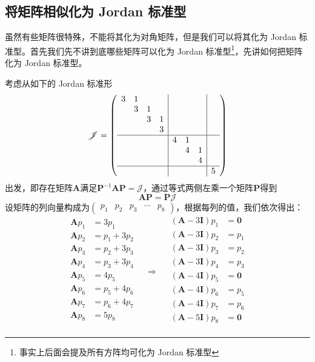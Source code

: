 \subsection{将矩阵相似化为 Jordan 标准型}

虽然有些矩阵很特殊，不能将其化为对角矩阵，但是我们可以将其化为 Jordan 标准型。首先我们先不讲到底哪些矩阵可以化为 Jordan 标准型\footnote{事实上后面会提及所有方阵均可化为 Jordan 标准型}，先讲如何把矩阵化为 Jordan 标准型。

考虑从如下的 Jordan 标准形 $$\mathscr{J}=\left( \begin{array}{cccc|ccc|c}
 3 & 1 &  &  &  &  &  & \\
  & 3 & 1 &  &  &  &  & \\
  &  & 3 & 1 &  &  &  & \\
  &  &  & 3 &  &  &  & \\ \hline
  &  &  &  & 4 & 1 &  & \\
  &  &  &  &  & 4 & 1 & \\
  &  &  &  &  &  & 4 & \\ \hline
  &  &  &  &  &  &  & 5
\end{array} \right)$$ 出发，即存在矩阵$\mathbf{A}$满足$\mathbf{P}^{-1}\mathbf{A}\mathbf{P}=\mathscr{J}$，通过等式两侧左乘一个矩阵$\mathbf{P}$得到$$\mathbf{A}\mathbf{P}=\mathbf{P}\mathscr{J}$$设矩阵的列向量构成为$\begin{pmatrix}
 p_1 & p_2 & p_3 & \cdots &p_8
\end{pmatrix}$，根据每列的值，我们依次得出：\begin{equation}
	\label{eq:simToJordan}
	\begin{aligned}
    \mathbf{A}p_1&= 3p_1\\
    \mathbf{A}p_2&= p_1+3p_2\\
    \mathbf{A}p_3&= p_2+3p_3\\
    \mathbf{A}p_4&= p_3+3p_4\\ \hline
    \mathbf{A}p_5&= 4p_5\\
    \mathbf{A}p_6&= p_5+4p_6\\
    \mathbf{A}p_7&= p_6+4p_7\\ \hline
    \mathbf{A}p_8&= 5p_8\\
\end{aligned}\quad \Longrightarrow \quad \begin{aligned}
    (\mathbf{A}-3\mathbf{I})p_1&= \boldsymbol{0}\\
    (\mathbf{A}-3\mathbf{I})p_2&= p_1\\
    (\mathbf{A}-3\mathbf{I})p_3&= p_2\\
    (\mathbf{A}-3\mathbf{I})p_4&= p_3\\ \hline
    (\mathbf{A}-4\mathbf{I})p_5&= \boldsymbol{0}\\
    (\mathbf{A}-4\mathbf{I})p_6&= p_5\\
    (\mathbf{A}-4\mathbf{I})p_7&= p_6\\ \hline
    (\mathbf{A}-5\mathbf{I})p_8&= \boldsymbol{0}\\
\end{aligned}
\end{equation}


